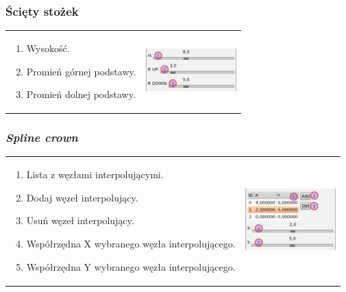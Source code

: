 \subsubsection{Ścięty stożek}
\begin{threeparttable}
\begin{tabular}{lr}
\parbox[c]{95mm}{
\begin{enumerate}
	\item {Wysokość.}
	\item {Promień górnej podstawy.}
	\item {Promień dolnej podstawy.}
\end{enumerate}
} &
\parbox[c]{35mm}{
\includegraphics[width=35mm]{images/gui/truncated_cone_crown.png}
}\\
\end{tabular}
\end{threeparttable}

\subsubsection{\textit{Spline crown}}
\begin{threeparttable}
\begin{tabular}{lr}
\parbox[c]{95mm}{
\begin{enumerate}
	\item {Lista z węzłami interpolującymi.}
	\item {Dodaj węzeł interpolujący.}
	\item {Usuń węzeł interpolujący.}
	\item {Współrzędna X wybranego węzła interpolującego.}
	\item {Współrzędna Y wybranego węzła interpolującego.}
\end{enumerate}
} &
\parbox[c]{35mm}{
\includegraphics[width=35mm]{images/gui/spline_crown.png}
}\\
\end{tabular}
\end{threeparttable}

